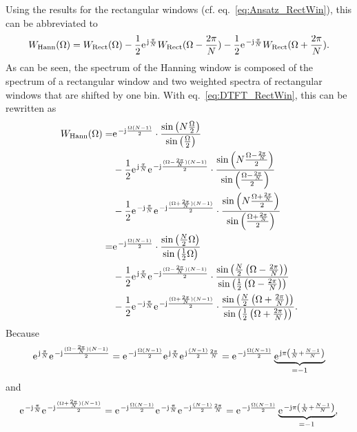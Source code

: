 \documentclass[11pt,a4paper,DIV=12]{scrartcl}
\begin{document}
%
Using the results for the rectangular windows
(cf. eq.~\eqref{eq:Ansatz_RectWin}), this can be abbreviated to
%
\begin{equation}
W_{\text{Hann}}(\Omega)=W_{\text{Rect}}(\Omega)-\frac{1}{2}\e^{\im\frac{\pi}{N}}W_{\text{Rect}}(\Omega-\frac{2\pi}{N})-\frac{1}{2}\e^{-\im\frac{\pi}{N}}W_{\text{Rect}}(\Omega+\frac{2\pi}{N}).
\end{equation}
%
As can be seen, the spectrum of the Hanning window is composed of the spectrum
of a rectangular window and two weighted spectra of rectangular windows
that are shifted by one bin.
%
With eq.~\eqref{eq:DTFT_RectWin}, this can be rewritten as
%
\begin{align}
W_{\text{Hann}}(\Omega)=&\e^{-\im\frac{\Omega(N-1)}{2}}\cdot\frac{\sin\left(N\frac{\Omega}{2}\right)}{\sin\left(\frac{\Omega}{2}\right)}\nonumber\\
&-\frac{1}{2}\e^{\im\frac{\pi}{N}}\e^{-\im\frac{(\Omega-\frac{2\pi}{N})(N-1)}{2}}\cdot\frac{\sin\left(N\frac{\Omega-\frac{2\pi}{N}}{2}\right)}{\sin\left(\frac{\Omega-\frac{2\pi}{N}}{2}\right)}\nonumber\\
&-\frac{1}{2}\e^{-\im\frac{\pi}{N}}\e^{-\im\frac{(\Omega+\frac{2\pi}{N})(N-1)}{2}}\cdot\frac{\sin\left(N\frac{\Omega+\frac{2\pi}{N}}{2}\right)}{\sin\left(\frac{\Omega+\frac{2\pi}{N}}{2}\right)}\\
=&\e^{-\im\frac{\Omega(N-1)}{2}}\cdot\frac{\sin\left(\frac{N}{2}\Omega\right)}{\sin\left(\frac{1}{2}\Omega\right)}\nonumber\\
&-\frac{1}{2}\e^{\im\frac{\pi}{N}}\e^{-\im\frac{(\Omega-\frac{2\pi}{N})(N-1)}{2}}\cdot\frac{\sin\left(\frac{N}{2}\left(\Omega-\frac{2\pi}{N}\right)\right)}{\sin\left(\frac{1}{2}\left(\Omega-\frac{2\pi}{N}\right)\right)}\nonumber\\
&-\frac{1}{2}\e^{-\im\frac{\pi}{N}}\e^{-\im\frac{(\Omega+\frac{2\pi}{N})(N-1)}{2}}\cdot\frac{\sin\left(\frac{N}{2}\left(\Omega+\frac{2\pi}{N}\right)\right)}{\sin\left(\frac{1}{2}\left(\Omega+\frac{2\pi}{N}\right)\right)}.
\end{align}
%
Because
%
\begin{equation}
\e^{\im\frac{\pi}{N}}\e^{-\im\frac{(\Omega-\frac{2\pi}{N})(N-1)}{2}}=\e^{-\im\frac{\Omega(N-1)}{2}}\e^{\im\frac{\pi}{N}}\e^{\im\frac{(N-1)}{2}\frac{2\pi}{N}}
=\e^{-\im\frac{\Omega(N-1)}{2}}\underbrace{\e^{\im\pi\left(\frac{1}{N}+\frac{N-1}{N}\right)}}_{=-1}
\end{equation}
%
and
%
\begin{equation}
\e^{-\im\frac{\pi}{N}}\e^{-\im\frac{(\Omega+\frac{2\pi}{N})(N-1)}{2}}=\e^{-\im\frac{\Omega(N-1)}{2}}\e^{-\im\frac{\pi}{N}}\e^{-\im\frac{(N-1)}{2}\frac{2\pi}{N}}
=\e^{-\im\frac{\Omega(N-1)}{2}}\underbrace{\e^{-\im\pi\left(\frac{1}{N}+\frac{N-1}{N}\right)}}_{=-1},
\end{equation}
\end{document}

